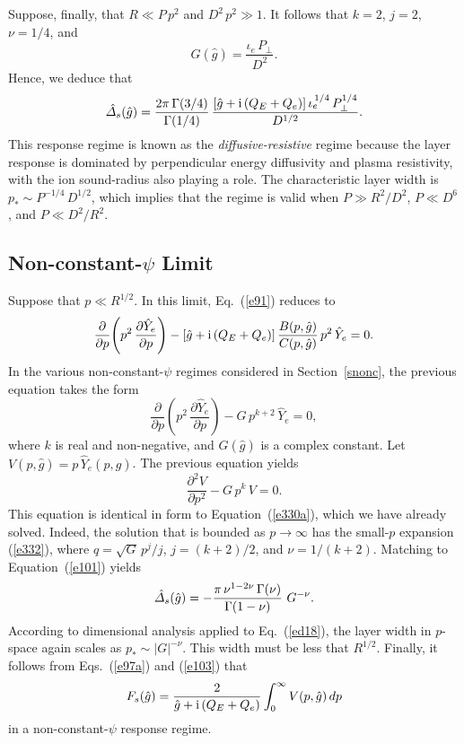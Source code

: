 \documentclass[12pt,prb,aps]{revtex4-1}
\begin{document}
Suppose, finally, that $R\ll P\,p^2$ and $D^2\,p^2\gg 1$. It follows that $k=2$, $j=2$, $\nu=1/4$, and
\begin{equation}
G(\hat{g}) = \frac{\iota_e\,P_\perp}{D^2}.
\end{equation}
Hence, we deduce that 
\begin{equation}\label{dr}
\hat{\mit\Delta}_s(\hat{g})= \frac{2\pi\,\Gamma(3/4)}{\Gamma(1/4)}\,\frac{[\hat{g}+{\rm i}\,(Q_E+Q_e)]\,\iota_e^{\,1/4}\,P_\perp^{1/4}}{D^{1/2}}.
\end{equation}
This response regime is known as the {\em diffusive-resistive}\/ regime because the layer 
response is dominated by perpendicular energy diffusivity and plasma resistivity, with the ion sound-radius also playing a role.\cite{err3} The characteristic
layer width is $p_\ast \sim P^{-1/4}\,D^{1/2}$, which implies that the regime is valid when $P\gg R^2/D^2$,
$P\ll D^6$, and $P\ll D^2/R^2$. 

\subsection{Non-constant-$\psi$ Limit}\label{sncp}
Suppose that $p\ll R^{1/2}$. In this limit, Eq.~(\ref{e91}) reduces to 
\begin{equation}
\frac{\partial}{\partial p}\!\left(p^2\,\frac{\partial\hat{Y}_e}{\partial p}\right)-[\hat{g}+{\rm i}\,(Q_E+Q_e)]\,\frac{B(p,\hat{g})}{C(p,\hat{g})}\,p^2\,\hat{Y}_e=0.
\end{equation}
In the various non-constant-$\psi$ regimes considered in Section~\ref{snonc}, the previous equation takes the form
\begin{equation}\label{ed18}
\frac{\partial}{\partial p}\!\left(p^2\,\frac{\partial \hat{Y}_e}{\partial p}\right)-G\,p^{k+2}\,\hat{Y}_e = 0,
\end{equation}
where $k$ is real and non-negative, and $G(\hat{g})$ is a complex constant. Let $V(p,\hat{g})=p\,\hat{Y}_e(p,\hat{g})$. The previous equation
yields
\begin{equation}
\frac{\partial^2 V}{\partial p^2} - G\,p^k\,V = 0.
\end{equation}
This equation is identical in form to Equation~(\ref{e330a}), which we have already solved. Indeed, the solution that
is bounded as $p\rightarrow\infty$ has the small-$p$ expansion (\ref{e332}), where $q=\!\sqrt{G}\,p^j/j$, 
$j=(k+2)/2$, and $\nu=1/(k+2)$. Matching to Equation~(\ref{e101}) yields
\begin{equation}
\hat{\mit\Delta}_s(\hat{g})= -\frac{\pi\,\nu^{1-2\nu}\,\Gamma(\nu)}{\Gamma(1-\nu)}\,\,G^{-\nu}.
\end{equation}
According to dimensional analysis applied to  Eq.~(\ref{ed18}), the layer width in $p$-space again scales as $p_\ast\sim |G|^{-\nu}$. This width must be
less that $R^{1/2}$.  
Finally, it follows from Eqs.~(\ref{e97a}) and (\ref{e103}) that
\begin{equation}
F_s(\hat{g}) = \frac{2}{\hat{g}+{\rm i}\,(Q_E+Q_e)}\int_0^\infty V(p,\hat{g})\,dp
\end{equation}
in a non-constant-$\psi$ response regime. 
\end{document}
